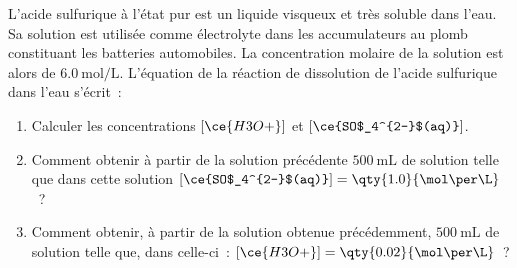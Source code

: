 L'acide sulfurique à l'état pur est un liquide visqueux et très soluble dans
l'eau. Sa solution est utilisée comme électrolyte dans les accumulateurs au
plomb constituant les batteries automobiles. La concentration molaire de la
solution est alors de $\qty{6.0}{\mol\per\L}$. L'équation de la réaction de
dissolution de l'acide sulfurique dans l'eau s'écrit~:

\begin{center}
\end{center}

\begin{enumerate}
    \item Calculer les concentrations $\left[\ce{H3O+}\right]$ et
          $\left[\ce{SO$_4^{2-}$(aq)}\right]$.
    \item Comment obtenir à partir de la solution précédente $\qty{500}{\mL}$ de
          solution telle que dans cette solution
          $\left[\ce{SO$_4^{2-}$(aq)}\right]=\qty{1.0}{\mol\per\L}$~?
    \item Comment obtenir, à partir de la solution obtenue précédemment,
          $\qty{500}{\mL}$ de solution telle que, dans celle-ci~:
          $\left[\ce{H3O+}\right]=\qty{0.02}{\mol\per\L}$~?
\end{enumerate}

